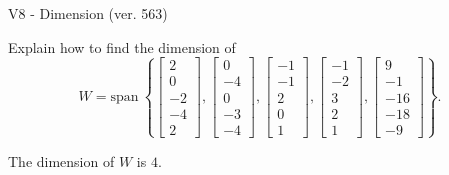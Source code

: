\begin{exercise}
  \begin{exerciseTitle}V8 - Dimension (ver. 563)\end{exerciseTitle}
  \begin{exerciseStatement}
    Explain how to find the dimension of 
\[W=\mathrm{span}\ \left\{\left[\begin{array}{r}
2 \\
0 \\
-2 \\
-4 \\
2
\end{array}\right] , \left[\begin{array}{r}
0 \\
-4 \\
0 \\
-3 \\
-4
\end{array}\right] , \left[\begin{array}{r}
-1 \\
-1 \\
2 \\
0 \\
1
\end{array}\right] , \left[\begin{array}{r}
-1 \\
-2 \\
3 \\
2 \\
1
\end{array}\right] , \left[\begin{array}{r}
9 \\
-1 \\
-16 \\
-18 \\
-9
\end{array}\right]\right\}.\]



  \end{exerciseStatement}
  \begin{exerciseAnswer}
   The dimension of \(W\) is  \(4\).
  


  \end{exerciseAnswer}
\end{exercise}